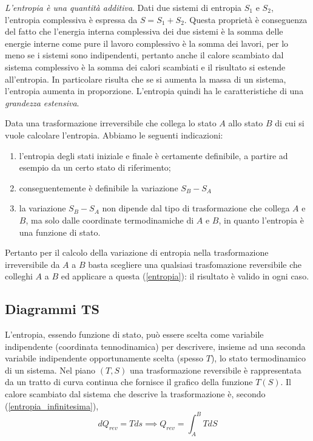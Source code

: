 \documentclass[class=book, crop=false, oneside, 12pt]{standalone}
\begin{document}
\emph{L'entropia è una quantità additiva}. Dati due sistemi di entropia \(S_1\) e \(S_2\), l'entropia complessiva è espressa da \(S = S_1 + S_2\).
Questa proprietà è conseguenza del fatto che l'energia interna complessiva dei due sistemi è la somma delle energie interne come pure il lavoro complessivo è la somma dei lavori, per lo meno se i sistemi sono indipendenti, pertanto anche il calore scambiato dal sistema complessivo è la somma dei calori scambiati e il risultato si estende all'entropia.
In particolare risulta che se si aumenta la massa di un sistema, l'entropia aumenta in proporzione.
L'entropia quindi ha le caratteristiche di una \emph{grandezza estensiva}.

Data una trasformazione irreversibile che collega lo stato \(A\) allo stato \(B\) di cui si vuole calcolare l'entropia.
Abbiamo le seguenti indicazioni:
\begin{enumerate}
    \item l'entropia degli stati iniziale e finale è certamente definibile, a partire ad esempio da un certo stato di riferimento; 
    \item conseguentemente è definibile la variazione \(S_B - S_A\) 
    \item la variazione \(S_B - S_A\) non dipende dal tipo di trasformazione che collega \(A\) e \(B\), ma solo dalle coordinate termodinamiche di \(A\) e \(B\), in quanto l'entropia è una funzione di stato. 
\end{enumerate}

Pertanto per il calcolo della variazione di entropia nella trasformazione irreversibile da \(A\) a \(B\) basta scegliere una qualsiasi trasfomazione reversibile che colleghi \(A\) a \(B\) ed applicare a questa (\ref{entropia}): il risultato è valido in ogni caso.

\subsection{Diagrammi TS}

L'entropia, essendo funzione di stato, può essere scelta come variabile indipendente (coordinata tennodinamica) per descrivere, insieme ad una seconda variabile indipendente opportunamente scelta (spesso \(T\)), lo stato termodinamico di un sistema.
Nel piano \(\left(T, S\right)\) una trasformazione reversibile è rappresentata da un tratto di curva continua che fornisce il grafico della funzione \(T (S)\).
Il calore scambiato dal sistema che descrive la trasformazione è, secondo (\ref{entropia_infinitesima}),
\begin{equation}
    d Q_{rev} = T ds \implies Q_{rev} = \int_A^B T d S
\end{equation}
\end{document}
